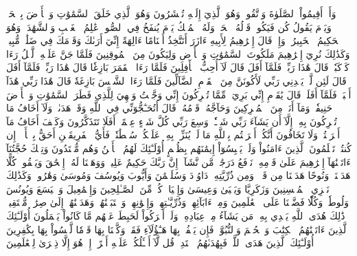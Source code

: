 وَأَنۡ أَقِيمُواْ ٱلصَّلَوٰةَ وَٱتَّقُوهُۚ وَهُوَ ٱلَّذِيٓ إِلَيۡهِ تُحۡشَرُونَ
وَهُوَ ٱلَّذِي خَلَقَ ٱلسَّمَٰوَٰتِ وَٱلۡأَرۡضَ بِٱلۡحَقِّۖ وَيَوۡمَ يَقُولُ كُن فَيَكُونُۚ قَوۡلُهُ ٱلۡحَقُّۚ وَلَهُ ٱلۡمُلۡكُ يَوۡمَ يُنفَخُ فِي ٱلصُّورِۚ عَٰلِمُ ٱلۡغَيۡبِ وَٱلشَّهَٰدَةِۚ وَهُوَ ٱلۡحَكِيمُ ٱلۡخَبِيرُ
۞وَإِذۡ قَالَ إِبۡرَٰهِيمُ لِأَبِيهِ ءَازَرَ أَتَتَّخِذُ أَصۡنَامًا ءَالِهَةً إِنِّيٓ أَرَىٰكَ وَقَوۡمَكَ فِي ضَلَٰلٖ مُّبِينٖ
وَكَذَٰلِكَ نُرِيٓ إِبۡرَٰهِيمَ مَلَكُوتَ ٱلسَّمَٰوَٰتِ وَٱلۡأَرۡضِ وَلِيَكُونَ مِنَ ٱلۡمُوقِنِينَ
فَلَمَّا جَنَّ عَلَيۡهِ ٱلَّيۡلُ رَءَا كَوۡكَبٗاۖ قَالَ هَٰذَا رَبِّيۖ فَلَمَّآ أَفَلَ قَالَ لَآ أُحِبُّ ٱلۡأٓفِلِينَ
فَلَمَّا رَءَا ٱلۡقَمَرَ بَازِغٗا قَالَ هَٰذَا رَبِّيۖ فَلَمَّآ أَفَلَ قَالَ لَئِن لَّمۡ يَهۡدِنِي رَبِّي لَأَكُونَنَّ مِنَ ٱلۡقَوۡمِ ٱلضَّآلِّينَ
فَلَمَّا رَءَا ٱلشَّمۡسَ بَازِغَةٗ قَالَ هَٰذَا رَبِّي هَٰذَآ أَكۡبَرُۖ فَلَمَّآ أَفَلَتۡ قَالَ يَٰقَوۡمِ إِنِّي بَرِيٓءٞ مِّمَّا تُشۡرِكُونَ
إِنِّي وَجَّهۡتُ وَجۡهِيَ لِلَّذِي فَطَرَ ٱلسَّمَٰوَٰتِ وَٱلۡأَرۡضَ حَنِيفٗاۖ وَمَآ أَنَا۠ مِنَ ٱلۡمُشۡرِكِينَ
وَحَآجَّهُۥ قَوۡمُهُۥۚ قَالَ أَتُحَـٰٓجُّوٓنِّي فِي ٱللَّهِ وَقَدۡ هَدَىٰنِۚ وَلَآ أَخَافُ مَا تُشۡرِكُونَ بِهِۦٓ إِلَّآ أَن يَشَآءَ رَبِّي شَيۡـٔٗاۚ وَسِعَ رَبِّي كُلَّ شَيۡءٍ عِلۡمًاۚ أَفَلَا تَتَذَكَّرُونَ
وَكَيۡفَ أَخَافُ مَآ أَشۡرَكۡتُمۡ وَلَا تَخَافُونَ أَنَّكُمۡ أَشۡرَكۡتُم بِٱللَّهِ مَا لَمۡ يُنَزِّلۡ بِهِۦ عَلَيۡكُمۡ سُلۡطَٰنٗاۚ فَأَيُّ ٱلۡفَرِيقَيۡنِ أَحَقُّ بِٱلۡأَمۡنِۖ إِن كُنتُمۡ تَعۡلَمُونَ
ٱلَّذِينَ ءَامَنُواْ وَلَمۡ يَلۡبِسُوٓاْ إِيمَٰنَهُم بِظُلۡمٍ أُوْلَـٰٓئِكَ لَهُمُ ٱلۡأَمۡنُ وَهُم مُّهۡتَدُونَ
وَتِلۡكَ حُجَّتُنَآ ءَاتَيۡنَٰهَآ إِبۡرَٰهِيمَ عَلَىٰ قَوۡمِهِۦۚ نَرۡفَعُ دَرَجَٰتٖ مَّن نَّشَآءُۗ إِنَّ رَبَّكَ حَكِيمٌ عَلِيمٞ
وَوَهَبۡنَا لَهُۥٓ إِسۡحَٰقَ وَيَعۡقُوبَۚ كُلًّا هَدَيۡنَاۚ وَنُوحًا هَدَيۡنَا مِن قَبۡلُۖ وَمِن ذُرِّيَّتِهِۦ دَاوُۥدَ وَسُلَيۡمَٰنَ وَأَيُّوبَ وَيُوسُفَ وَمُوسَىٰ وَهَٰرُونَۚ وَكَذَٰلِكَ نَجۡزِي ٱلۡمُحۡسِنِينَ
وَزَكَرِيَّا وَيَحۡيَىٰ وَعِيسَىٰ وَإِلۡيَاسَۖ كُلّٞ مِّنَ ٱلصَّـٰلِحِينَ
وَإِسۡمَٰعِيلَ وَٱلۡيَسَعَ وَيُونُسَ وَلُوطٗاۚ وَكُلّٗا فَضَّلۡنَا عَلَى ٱلۡعَٰلَمِينَ
وَمِنۡ ءَابَآئِهِمۡ وَذُرِّيَّـٰتِهِمۡ وَإِخۡوَٰنِهِمۡۖ وَٱجۡتَبَيۡنَٰهُمۡ وَهَدَيۡنَٰهُمۡ إِلَىٰ صِرَٰطٖ مُّسۡتَقِيمٖ
ذَٰلِكَ هُدَى ٱللَّهِ يَهۡدِي بِهِۦ مَن يَشَآءُ مِنۡ عِبَادِهِۦۚ وَلَوۡ أَشۡرَكُواْ لَحَبِطَ عَنۡهُم مَّا كَانُواْ يَعۡمَلُونَ
أُوْلَـٰٓئِكَ ٱلَّذِينَ ءَاتَيۡنَٰهُمُ ٱلۡكِتَٰبَ وَٱلۡحُكۡمَ وَٱلنُّبُوَّةَۚ فَإِن يَكۡفُرۡ بِهَا هَـٰٓؤُلَآءِ فَقَدۡ وَكَّلۡنَا بِهَا قَوۡمٗا لَّيۡسُواْ بِهَا بِكَٰفِرِينَ
أُوْلَـٰٓئِكَ ٱلَّذِينَ هَدَى ٱللَّهُۖ فَبِهُدَىٰهُمُ ٱقۡتَدِهۡۗ قُل لَّآ أَسۡـَٔلُكُمۡ عَلَيۡهِ أَجۡرًاۖ إِنۡ هُوَ إِلَّا ذِكۡرَىٰ لِلۡعَٰلَمِينَ
